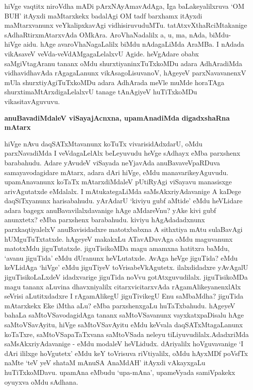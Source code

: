 hiVge vaqtitx niroVdha mADi pArxNAyAmavAdAga, Iga baLakeyalilxruva `OM BUH' itAyxdi maMtarxkekx\- badalAgi OM tadf barxhamx itAyxdi maMtarxvanunx veYkalipxkavAgi vidhisiruvuduMTu. tatAtxvXthaRciMtaka\-nige sAdhaRtirxmAtarxvAda OMkAra. AroVhaNadalilx a, u, ma, nAda, biMdu- hiVge aidu. hAge avaroVhaNagaLalilx biMdu nAdagaLiMda AraMBa. I nAdada vikAsaveV veVda-veVdAMgagaLelalxvU Agide. heVgAdare obabx saMgiVtagAranu tananx oMdu shurxtiyaninxTuTxkoMDu adara AdhAradiMda vidhavidhavAda rAgagaLanunx vikAsagoLisuvanoV, hAgeyeV parxNavavanenxV mUla shurxtiyAgiTuTxkoMDu adara AdhArada meVle muMde horaTAga shurxtimaMtArxdigaLelalxvU tanage tAnAgiyeV huTiTxkoMDu vikasitavAguvuvu.

{\bigskip
\noindent
{\large\bf anuBavadiMdaleV viSayajAcnxna, upamAnadiMda digadxshaRna mAtarx}}\label{page166}
\medskip

\noindent
hiVge nAvu daqSATxMtavanunx koTuTx vivarisidAdxdarU, oMdu parxNavadiMda I veVdagaLelAlx beLeyu\-vudu heVge sAdhayx eMba parxshenx barabahudu. Adare yAvudeV viSayada neYjavAda anuBavaveVpaR\-Duva samayavodagidare mAtarx, adara dAri hiVge, eMdu manavarikeyAguvudu. upamAna\-vanunx koTaTx mAtarxdiMdaleV pUtiR\-yAgi viSayavu manasisxge arivAgutatxde eMdalalx. I mAtukatega\-LiMda saMsAkxri\-yAdavanige A kaDege daqSiTxyanunx harisabahudu. yArAdarU `kiviyu gubf aMtide' eMdu heVLidare adara bagegx anuBavavilalxdavanige hAge aMdareVnu? yAke kivi gubf anunxtetx? eMba parxshenx barabahudu. kiviyu hAgAdadadxnunx parxkaqtiyalelxV anuBavisidadxre matotxbabxna A sithxtiya mAtu sulaBa\-vAgi hUMguTuTxtatxde. hAgeyeV makakxLu ATavADuvAga oMdu maguvanunx matotxMdu jiguTu\-tatxde. jiguTisikoMDa magu amamxna hatitxra baMdu, `avanu jiguTida' eMdu dUranunx heVLutatxde. AvAga\- heVge jiguTida? eMdu keVLidAga `hiVge' eMdu jiguTiyeV toVrisabeVkAgutetx. ilalxdi\-dadxre yAvA\-galU jiguTisikoLaLxdeV idadx\-varige jiguTida noVvu gotAtxguvudilalx. jiguTisikoMDa magu tananx aLu\-vina dhavxni\-yalilx citarxvicitarxvAda rAgamAlikeyanenxlAlx seVrisi aLutitxdadxre I rAgamAlikegU jiguTivikegU Enu saMbaMdha? jiguTida mAtarxkekx Eke iMtha aLu? eMba parxshenx\-gaLu huTaTxbahudu. hAgeyeV bahaLa\- saMtoVSavodagidAga tananx saMtoVSavanunx vayxkatxpaDisalu hAge saMtoVSavAyitu, hiVge saMtoVSa\-vAyitu eMdu keVvala daqSATxMtagaLanunx koTaTxre, saMtoVSapaTaTxvana saMtoVSada neleyu tiLiyuvu\-dilalx.\break AdadxriMda saMsAkxriyAdavanige - eMdu modaleV heVLidudx. dAriyalilx hoVgu\-vavanige `I dAri ililxge hoVgutetx' eMdu keY toVrisuva riVtiyalilx, oMdu hAyxMDf poVsfTx naMte `teV yeV shataM mAnuSA AnaMdAH'\label{166} itAyxdi vAkayxgaLu huTiTxkoMDavu. upamAna eMbudu `upa-mAna', upa\-meVyada samiVpakekx oyuyxva oMdu sAdhana.

